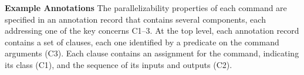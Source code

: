 \documentclass[sigplan, review, screen, anonymous]{acmart}
\newcommand{\heading}[1]{\vspace{4pt}\noindent\textbf{#1}\enspace}
\newcommand{\ttt}[1]{\texttt{#1}}
\newcommand{\cn}[1]{\mbox{\textcircled{\footnotesize #1}}}
\newcommand{\sta}{\cn{\textsc{S}}\xspace}
\newcommand{\pur}{\cn{\textsc{P}}\xspace}
\newcommand{\nv}[1]{[{\color{cyan}nv: #1}]}
\newcommand{\str}{{\color{red}\textbf{\ttt{*}}}}
\begin{document}



\heading{Example Annotations}
The parallelizability properties of each command are specified in an annotation record that contains several components, each addressing one of the key concerns C1--3.
At the top level, each annotation record contains a set of clauses, each one identified by a predicate on the command arguments (C3). 
Each clause contains an assignment for the command, indicating its class (C1), and the sequence of its inputs and outputs (C2).
\end{document}
